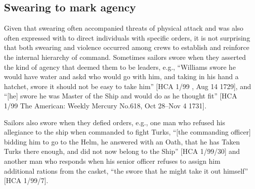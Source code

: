 \subsection{{Swearing to mark agency}}%

Given that swearing often accompanied threats of physical attack and was also often expressed with  to direct individuals with specific orders, it is not surprising that both swearing and violence occurred among crews to establish and reinforce the internal hierarchy of command. Sometimes sailors swore when they asserted the kind of agency that deemed them to be leaders, e.g., “Williams swore he would have water and askd who would go with him, and taking in his hand a hatchet, swore it should not be easy to take him” [HCA 1/99 , Aug 14 1729], and “[he] swore he was Master of the Ship and would do as he thought fit” [HCA 1/99 The American: Weekly Mercury No.618, Oct 28–Nov 4 1731]. 

Sailors also swore when they defied orders, e.g., one man who refused his allegiance to the ship when commanded to fight Turks, “[the commanding officer] bidding him to go to the Helm, he answered with an Oath, that he has Taken Turks there enough, and did not now belong to the Ship” [HCA 1/99/30] and another man who responds when his senior officer refuses to assign him additional rations from the casket, “the  swore that he might take it out himself” [HCA 1/99/7]. 

